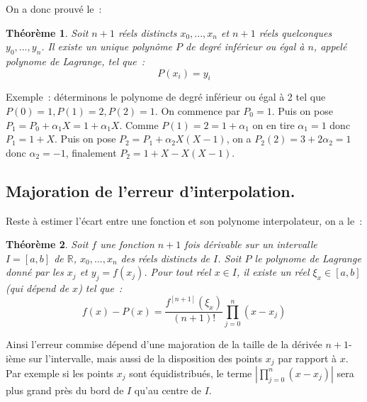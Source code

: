 \documentclass[a4paper,11pt]{book}
\newtheorem{thm}{Théorème}
\begin{document}
\begin{giacjshere}
On a donc prouv\'e le~:
\begin{thm}  
Soit $n+1$ r\'eels distincts $x_0,...,x_n$ et $n+1$
r\'eels quelconques $y_0,...,y_n$.
Il existe un unique polyn\^ome $P$ de degr\'e inf\'erieur ou \'egal \`a
$n$, appel\'e polynome de Lagrange, tel que~:
\[ P(x_i)=y_i\]
\end{thm}

Exemple~: d\'eterminons le polynome de degr\'e inf\'erieur ou \'egal
\`a 2 tel que $P(0)=1, P(1)=2, P(2)=1$. On commence par $P_0=1$.
Puis on pose $P_1=P_0+ \alpha_{1}X=1+ \alpha_{1}X$. 
Comme $P(1)=2=1+ \alpha_{1}$ on en tire $ \alpha_{1}=1$
donc $P_1=1+X$. Puis on pose $P_2=P_1+ \alpha_{2}X(X-1)$, on a 
$P_2(2)=3+2 \alpha_{2}=1$
donc $ \alpha_{2}=-1$, finalement $P_2=1+X-X(X-1)$.\\

\subsection{Majoration de l'erreur d'interpolation.}
Reste \`a estimer l'\'ecart entre une fonction et son polynome
interpolateur, on a le~:
\begin{thm} 
Soit $f$ une fonction $n+1$ fois d\'erivable sur un intervalle $I=[a,b]$
de $\mathbb{R}$, $x_0,...,x_n$ des r\'eels distincts de $I$. 
Soit $P$ le polynome de Lagrange donn\'e par les $x_j$ et $y_j=f(x_j)$.
Pour tout r\'eel $x \in I$,
il existe un r\'eel $\xi_x \in [a,b]$ (qui d\'epend de $x$) tel
que~:
\begin{equation} \label{eq:lagrange}
 f(x)-P(x) = \frac{f^{[n+1]}(\xi_x)}{(n+1)!} \prod_{j=0}^n(x-x_j) 
\end{equation}
\end{thm}
Ainsi l'erreur commise d\'epend d'une majoration de la taille
de la d\'eriv\'ee $n+1$-i\`eme sur l'intervalle, mais aussi
de la disposition des points $x_j$ par rapport \`a $x$. Par exemple
si les points $x_j$ sont \'equidistribu\'es, le terme
$|\prod_{j=0}^n(x-x_j)|$ sera plus grand pr\`es du bord de $I$ qu'au
centre de $I$.


\end{giacjshere}
\end{document}
